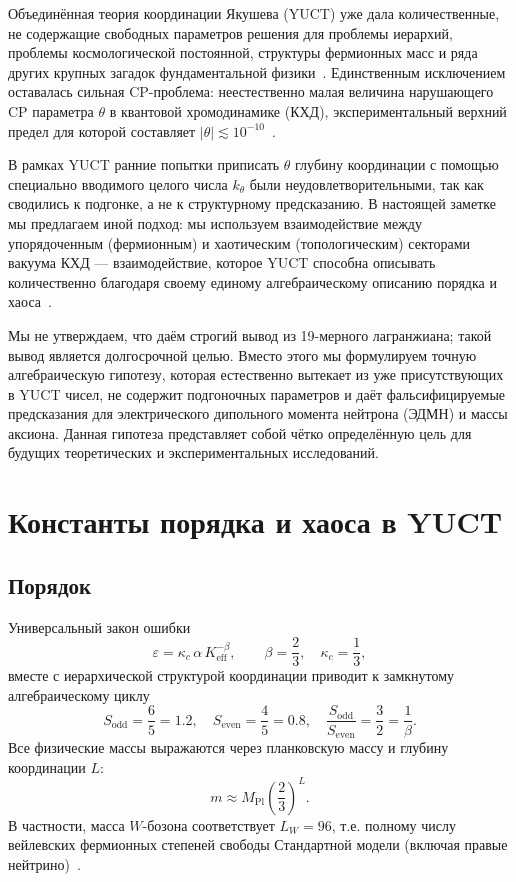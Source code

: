 \documentclass[11pt,a4paper]{article}
\begin{document}
	Объединённая теория координации Якушева (YUCT) уже дала количественные, не содержащие свободных параметров решения для проблемы иерархий, проблемы космологической постоянной, структуры фермионных масс и ряда других крупных загадок фундаментальной физики~\cite{Y1,Y3,Y4}. Единственным исключением оставалась сильная CP-проблема: неестественно малая величина нарушающего CP параметра \(\theta\) в квантовой хромодинамике (КХД), экспериментальный верхний предел для которой составляет \(|\theta| \lesssim 10^{-10}\)~\cite{nEDM2020}.
	
	В рамках YUCT ранние попытки приписать \(\theta\) глубину координации с помощью специально вводимого целого числа \(k_\theta\) были неудовлетворительными, так как сводились к подгонке, а не к структурному предсказанию. В настоящей заметке мы предлагаем иной подход: мы используем взаимодействие между упорядоченным (фермионным) и хаотическим (топологическим) секторами вакуума КХД — взаимодействие, которое YUCT способна описывать количественно благодаря своему единому алгебраическому описанию порядка и хаоса~\cite{Y2,Feig}.
	
	Мы не утверждаем, что даём строгий вывод из 19-мерного лагранжиана; такой вывод является долгосрочной целью. Вместо этого мы формулируем точную алгебраическую гипотезу, которая естественно вытекает из уже присутствующих в YUCT чисел, не содержит подгоночных параметров и даёт фальсифицируемые предсказания для электрического дипольного момента нейтрона (ЭДМН) и массы аксиона. Данная гипотеза представляет собой чётко определённую цель для будущих теоретических и экспериментальных исследований.
	
	\section{Константы порядка и хаоса в YUCT}
	\label{sec:oc}
	
	\subsection{Порядок}
	Универсальный закон ошибки
	\[
	\varepsilon = \kappa_c\,\alpha\,K_{\mathrm{eff}}^{-\beta},\qquad \beta = \frac{2}{3},\quad \kappa_c = \frac{1}{3},
	\]
	вместе с иерархической структурой координации приводит к замкнутому алгебраическому циклу
	\[
	S_{\mathrm{odd}} = \frac{6}{5} = 1.2,\quad S_{\mathrm{even}} = \frac{4}{5} = 0.8,\quad 
	\frac{S_{\mathrm{odd}}}{S_{\mathrm{even}}} = \frac{3}{2} = \frac{1}{\beta}.
	\]
	Все физические массы выражаются через планковскую массу и глубину координации \(L\):
	\[
	m \approx M_{\mathrm{Pl}}\left(\frac{2}{3}\right)^L.
	\]
	В частности, масса \(W\)-бозона соответствует \(L_W = 96\), т.е. полному числу вейлевских фермионных степеней свободы Стандартной модели (включая правые нейтрино)~\cite{Y3}.
	
\end{document}
